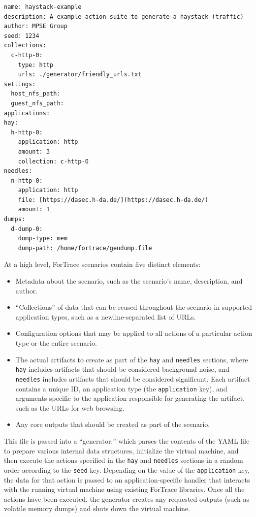 \documentclass[letterpaper,12pt]{report}
\def\tightlist{}
\newcommand{\passthrough}[1]{#1}
\begin{document}
\begin{lstlisting}[label={lst:6.3.1a}, caption={Declarative ForTrace scenario with web browsing \cite{gobelForTraceHolisticForensic2022}}, ]
name: haystack-example
description: A example action suite to generate a haystack (traffic)
author: MPSE Group
seed: 1234
collections:
  c-http-0:
    type: http
    urls: ./generator/friendly_urls.txt
settings:
  host_nfs_path:
  guest_nfs_path:
applications:
hay:
  h-http-0:
    application: http
    amount: 3
    collection: c-http-0
needles:
  n-http-0:
    application: http
    file: [https://dasec.h-da.de/](https://dasec.h-da.de/)
    amount: 1
dumps:
  d-dump-0:
    dump-type: mem
    dump-path: /home/fortrace/gendump.file
\end{lstlisting}

At a high level, ForTrace scenarios contain five distinct elements:

\begin{itemize}
\tightlist
\item
  Metadata about the scenario, such as the scenario's name, description,
  and author.
\item
  ``Collections'' of data that can be reused throughout the scenario in
  supported application types, such as a newline-separated list of URLs.
\item
  Configuration options that may be applied to all actions of a
  particular action type or the entire scenario.
\item
  The actual artifacts to create as part of the
  \passthrough{\lstinline!hay!} and \passthrough{\lstinline!needles!}
  sections, where \passthrough{\lstinline!hay!} includes artifacts that
  should be considered background noise, and
  \passthrough{\lstinline!needles!} includes artifacts that should be
  considered significant. Each artifact contains a unique ID, an
  application type (the \passthrough{\lstinline!application!} key), and
  arguments specific to the application responsible for generating the
  artifact, such as the URLs for web browsing.
\item
  Any core outputs that should be created as part of the scenario.
\end{itemize}

This file is passed into a ``generator,'' which parses the contents of
the YAML file to prepare various internal data structures, initialize
the virtual machine, and then execute the actions specified in the
\passthrough{\lstinline!hay!} and \passthrough{\lstinline!needles!}
sections in a random order according to the
\passthrough{\lstinline!seed!} key. Depending on the value of the
\passthrough{\lstinline!application!} key, the data for that action is
passed to an application-specific handler that interacts with the
running virtual machine using existing ForTrace libraries. Once all the
actions have been executed, the generator creates any requested outputs
(such as volatile memory dumps) and shuts down the virtual machine.
\end{document}
